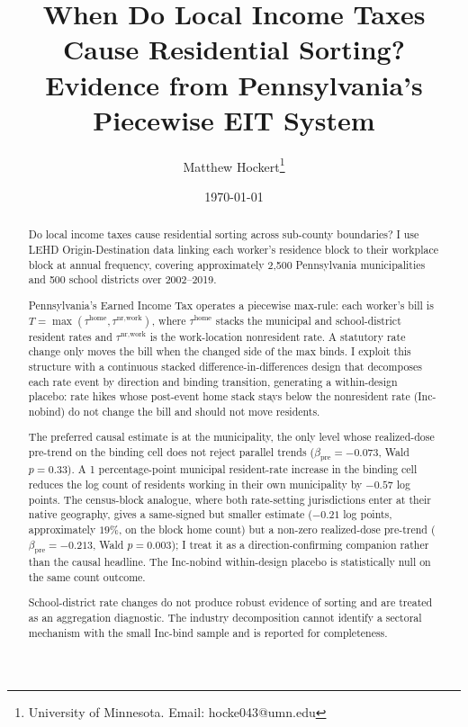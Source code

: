 \documentclass[12pt]{article}
\title{When Do Local Income Taxes Cause Residential Sorting? \\
\large Evidence from Pennsylvania's Piecewise EIT System}
\author{Matthew Hockert\thanks{University of Minnesota. Email: hocke043@umn.edu}}
\date{\today}
\begin{document}
\maketitle

\begin{abstract}
Do local income taxes cause residential sorting across sub-county
boundaries? I use LEHD Origin-Destination data linking each
worker's residence block to their workplace block at annual
frequency, covering approximately 2{,}500 Pennsylvania
municipalities and 500 school districts over 2002--2019.

Pennsylvania's Earned Income Tax operates a piecewise max-rule:
each worker's bill is
$T = \max(\tau^{\text{home}}, \tau^{\text{nr,work}})$, where
$\tau^{\text{home}}$ stacks the municipal and school-district
resident rates and $\tau^{\text{nr,work}}$ is the work-location
nonresident rate. A statutory rate change only moves the bill when
the changed side of the max binds. I exploit this structure with a
continuous stacked difference-in-differences design that decomposes
each rate event by direction and binding transition, generating
a within-design placebo: rate hikes whose post-event home stack
stays below the nonresident rate (Inc-nobind) do not change the bill
and should not move residents.

The preferred causal estimate is at the municipality, the only
level whose realized-dose pre-trend on the binding cell does not
reject parallel trends ($\beta_{\text{pre}} = -0.073$, Wald $p=0.33$).
A 1 percentage-point municipal resident-rate increase in the binding
cell reduces the log count of residents working in their own
municipality by $-0.57$ log points. The census-block analogue, where
both rate-setting jurisdictions enter at their native geography,
gives a same-signed but smaller estimate ($-0.21$ log points,
approximately $19\%$, on the block home count) but a non-zero
realized-dose pre-trend ($\beta_{\text{pre}} = -0.213$, Wald
$p=0.003$); I treat it as a direction-confirming companion rather
than the causal headline. The Inc-nobind within-design placebo is
statistically null on the same count outcome.

School-district rate changes do
not produce robust evidence of sorting and are treated as an
aggregation diagnostic. The industry decomposition cannot identify
a sectoral mechanism with the small Inc-bind sample and is
reported for completeness.
\end{abstract}

\newpage
\end{document}
